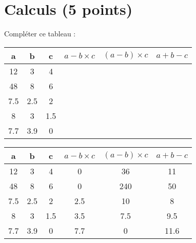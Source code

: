 \section{Calculs (5 points)}

\begin{questions}


\question Compléter ce tableau :

\begin{center}
	{\Large \begin{tabular}{|@{\ }c@{\ }|@{\ }c@{\ }|@{\ }c@{\ }|@{\ }c@{\ }|@{\ }c@{\ }|@{\ }c@{\ }|}
	\hline
	\textbf{a} & \textbf{b} & \textbf{c} & \textbf{$a-b \times c$} & \textbf{$(a-b) \times c$} & \textbf{$a + b - c$} \\ \hline
	12         & 3          & 4          &                         &                           &                      \\ \hline
	48         & 8          & 6          &                         &                           &                      \\ \hline
	\num{7.5}  & \num{2.5}  & 2          &                         &                           &                      \\ \hline
	8          & 3          & \num{1.5}  &                         &                           &                      \\ \hline
	\num{7.7}  & \num{3.9}  & 0          &                         &                           &                      \\ \hline
\end{tabular}}
\end{center}


\begin{solution}
	\begin{center}
		{\Large \begin{tabular}{|@{\ }c@{\ }|@{\ }c@{\ }|@{\ }c@{\ }|@{\ }c@{\ }|@{\ }c@{\ }|@{\ }c@{\ }|}
				\hline
				\textbf{a} & \textbf{b} & \textbf{c} & \textbf{$a-b \times c$} & \textbf{$(a-b) \times c$} & \textbf{$a + b - c$} \\ \hline
				12         & 3          & 4          & 0                       &   36                      &   11                 \\ \hline
				48         & 8          & 6          & 0                       &   240                     &       50             \\ \hline
				\num{7.5}  & \num{2.5}  & 2          &  \num{2.5}              &   10                      &        8             \\ \hline
				8          & 3          & \num{1.5}  &  \num{3.5}              &  \num{7.5}                &   \num{9.5}          \\ \hline
				\num{7.7}  & \num{3.9}  & 0          &  \num{7.7}              & 0                         &  \num{11.6}          \\ \hline
		\end{tabular}}
	\end{center}
\end{solution}
\end{questions}